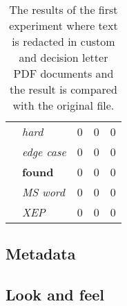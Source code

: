 \begin{table}[h]
\begin{tabular}{llccc}
 & \multicolumn{1}{l|}{\textit{hard}}      & 0                                                                                    & 0                                                                    & 0                                                                                  \\
 & \multicolumn{1}{l|}{\textit{edge case}} & 0                                                                                    & 0                                                                    & 0                                                                                  \\
 & \multicolumn{1}{l|}{\textbf{found}}     & 0                                                                                    & 0                                                                    & 0                                                                                  \\
 & \multicolumn{1}{l|}{\textit{MS word}}   & 0                                                                                    & 0                                                                    & 0                                                                                  \\
 & \multicolumn{1}{l|}{\textit{XEP}}       & 0                                                                                    & 0                                                                    & 0                                                                                 
\end{tabular}
\caption{The results of the first experiment where text is redacted in custom and decision letter PDF documents and the result is compared with the original file.}
\end{table}
\subsection{Metadata}
\subsection{Look and feel}


